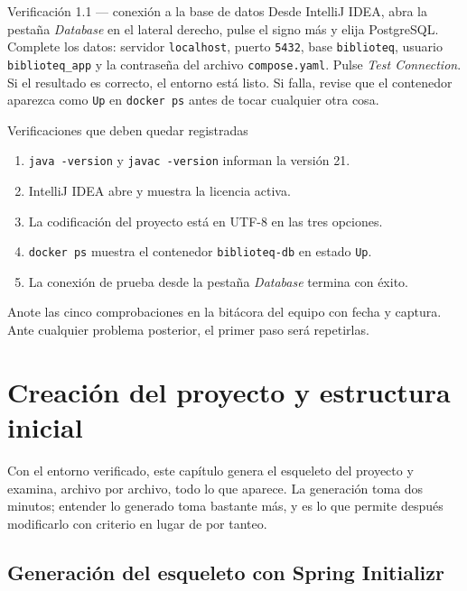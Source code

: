 \documentclass[11pt,a4paper,openany]{book}
\begin{document}
\begin{cajaejercicio}{Verificación 1.1 --- conexión a la base de datos}
	Desde IntelliJ IDEA, abra la pestaña \emph{Database} en el lateral derecho, pulse el signo más y elija PostgreSQL. Complete los datos: servidor \texttt{localhost}, puerto \texttt{5432}, base \texttt{biblioteq}, usuario \texttt{biblioteq\_app} y la contraseña del archivo \texttt{compose.yaml}. Pulse \emph{Test Connection}. Si el resultado es correcto, el entorno está listo. Si falla, revise que el contenedor aparezca como \texttt{Up} en \texttt{docker ps} antes de tocar cualquier otra cosa.
\end{cajaejercicio}

\begin{cajabuenas}{Verificaciones que deben quedar registradas}
	\begin{enumerate}
		\item \texttt{java -version} y \texttt{javac -version} informan la versión 21.
		\item IntelliJ IDEA abre y muestra la licencia activa.
		\item La codificación del proyecto está en UTF-8 en las tres opciones.
		\item \texttt{docker ps} muestra el contenedor \texttt{biblioteq-db} en estado \texttt{Up}.
		\item La conexión de prueba desde la pestaña \emph{Database} termina con éxito.
	\end{enumerate}
	Anote las cinco comprobaciones en la bitácora del equipo con fecha y captura. Ante cualquier problema posterior, el primer paso será repetirlas.
\end{cajabuenas}

\chapter{Creación del proyecto y estructura inicial}
\label{cap:creacion}

Con el entorno verificado, este capítulo genera el esqueleto del proyecto y examina, archivo por archivo, todo lo que aparece. La generación toma dos minutos; entender lo generado toma bastante más, y es lo que permite después modificarlo con criterio en lugar de por tanteo.

\section{Generación del esqueleto con Spring Initializr}
\label{sec:initializr}
\end{document}

